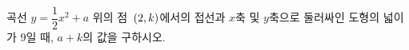 곡선 $y=\dfrac{1}{2}x^2+a$ 위의 점~$(2{,}\mkern3mu\mathopen{}k)$에서의 접선과 $x$축 및 $y$축으로 둘러싸인 도형의 넓이가 $9$일 때, $a+k$의 값을 구하시오. 
